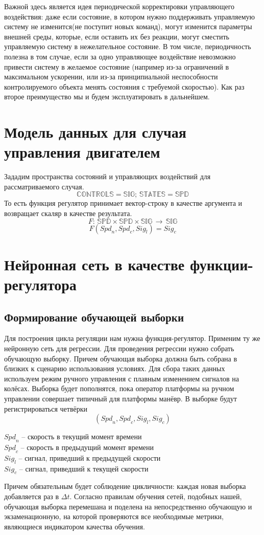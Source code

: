 \documentclass[14pt]{extreport}
\begin{document}
            Важной здесь является идея периодической корректировки управляющего воздействия: даже если состояние, в котором нужно поддерживать управляемую систему не изменится(не поступит новых команд), могут изменится параметры внешней среды, которые, если оставить их без реакции, могут сместить управляемую систему в нежелательное состояние. В том числе, периодичность полезна в том случае, если за одно управляющее воздействие невозможно привести систему в желаемое состояние (например из-за ограничений в максимальном ускорении, или из-за принципиальной неспособности контролируемого объекта менять состояния с требуемой скоростью). Как раз второе преимущество мы и будем эксплуатировать в дальнейшем.
        \section{Модель данных для случая управления двигателем}
            Зададим пространства состояний и управляющих воздействий для рассматриваемого случая.
            \[\mathbb{CONTROLS} = \mathbb{SIG};\, \mathbb{STATES} = \mathbb{SPD}\]
            То есть функция регулятор принимает вектор-строку в качестве аргумента и возвращает скаляр в качестве результата.
            \[F:\,\mathbb{SPD}\times\mathbb{SPD}\times\mathbb{SIG}\,\rightarrow\,\mathbb{SIG}\]
            \[F({Spd}_n,{Spd}_c,{Sig}_l) = {Sig}_c\]
        \section{Нейронная сеть в качестве функции-регулятора}
            \subsection{Формирование обучающей выборки}
                Для построения цикла регуляции нам нужна функция-регулятор. Применим ту же нейронную сеть для регрессии. Для проведения регрессии нужно собрать обучающую выборку. Причем обучающая выборка должна быть собрана в близких к сценарию использования условиях. Для сбора таких данных используем режим ручного управления с плавным изменением сигналов на колёсах. Выборка будет пополнятся, пока оператор платформы на ручном управлении совершает типичный для платформы манёвр. В выборке будут регистрироваться четвёрки
                    \[({Spd}_n,{Spd}_c,{Sig}_l,{Sig}_c)\]
                    \begin{center}
                      \({Spd}_n\) -- скорость в текущий момент времени\\
                      \({Spd}_c\) -- скорость в предыдущий момент времени\\
                      \({Sig}_l\) -- сигнал, приведший к предыдущей скорости\\
                      \({Sig}_c\) -- сигнал, приведший к текущей скорости\\
                    \end{center}
                Причем обязательным будет соблюдение цикличности: каждая новая выборка добавляется раз в $\Delta t$.
                Согласно правилам обучения сетей, подобных нашей, обучающая выборка перемешана и поделена на непосредственно обучающую и экзаменационную, на которой проверяются все необходимые метрики, являющиеся индикатором качества обучения.
\end{document}

